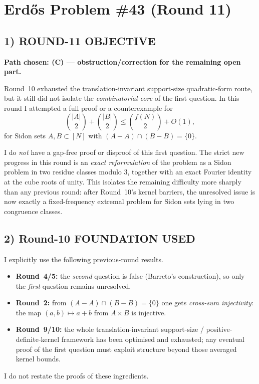 \section{Erd\H{o}s Problem \#43 (Round 11)}

\subsection{1) ROUND-11 OBJECTIVE}

\textbf{Path chosen: (C) --- obstruction/correction for the remaining open part.}

Round~10 exhausted the translation-invariant support-size quadratic-form route, but it still did not isolate the \emph{combinatorial core} of the first question.  In this round I attempted a full proof or a counterexample for
\[
\binom{|A|}{2}+\binom{|B|}{2}\le \binom{f(N)}{2}+O(1),
\]
for Sidon sets $A,B\subset [N]$ with $(A-A)\cap(B-B)=\{0\}$.

I do \emph{not} have a gap-free proof or disproof of this first question.  The strict new progress in this round is an \emph{exact reformulation} of the problem as a Sidon problem in two residue classes modulo $3$, together with an exact Fourier identity at the cube roots of unity.  This isolates the remaining difficulty more sharply than any previous round: after Round~10's kernel barriers, the unresolved issue is now exactly a fixed-frequency extremal problem for Sidon sets lying in two congruence classes.

\subsection{2) Round-10 FOUNDATION USED}

I explicitly use the following previous-round results.
\begin{itemize}
\item \textbf{Round~4/5:} the \emph{second} question is false (Barreto's construction), so only the \emph{first} question remains unresolved.
\item \textbf{Round~2:} from $(A-A)\cap(B-B)=\{0\}$ one gets \emph{cross-sum injectivity}: the map $(a,b)\mapsto a+b$ from $A\times B$ is injective.
\item \textbf{Round~9/10:} the whole translation-invariant support-size / positive-definite-kernel framework has been optimised and exhausted; any eventual proof of the first question must exploit structure beyond those averaged kernel bounds.
\end{itemize}
I do not restate the proofs of these ingredients.

